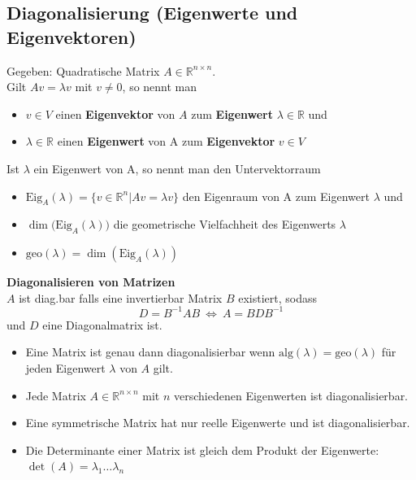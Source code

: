 \documentclass[6pt,a4paper]{scrartcl}
\begin{document}
\begin{multicols*}{4}
\subsection{Diagonalisierung (Eigenwerte und Eigenvektoren)}
Gegeben: Quadratische Matrix $A \in \mathbb{R}^{n\times n}$.\\
Gilt $Av = \lambda v$ mit $v\ne 0$, so nennt man
\begin{itemize}\itemsep0pt
\item $v\in V$ einen \textbf{Eigenvektor} von $A$ zum \textbf{Eigenwert} $\lambda \in \mathbb{R}$ und 
\item $\lambda \in \mathbb{R}$ einen \textbf{Eigenwert} von A zum \textbf{Eigenvektor} $v\in V$
\end{itemize}
Ist $\lambda$ ein Eigenwert von A, so nennt man den Untervektorraum
\begin{itemize}\itemsep0pt
\item $\text{Eig}_A(\lambda) = \{v \in \mathbb{R}^n | Av = \lambda v\}$ den Eigenraum von A zum Eigenwert $\lambda$ und
\item $\dim({\text{Eig}_A(\lambda))}$ die geometrische Vielfachheit des Eigenwerts $\lambda$
\item $\text{geo}(\lambda) = \dim(\text{Eig}_A(\lambda))$
\end{itemize}
\textbf{Diagonalisieren von Matrizen}\\
$A$ ist diag.bar falls eine invertierbar Matrix $B$ existiert, sodass
\begin{equation*}
D=B^{-1}AB \ \Leftrightarrow \ A=BDB^{-1}
\end{equation*}
und $D$ eine Diagonalmatrix ist.
\begin{itemize}\itemsep0pt
\item Eine Matrix ist genau dann diagonalisierbar wenn $\text{alg}(\lambda)=\text{geo}(\lambda)$ für jeden Eigenwert $\lambda$ von $A$ gilt.
\item Jede Matrix $A \in \mathbb{R}^{n\times n}$ mit $n$ verschiedenen Eigenwerten ist diagonalisierbar.
\item Eine symmetrische Matrix hat nur reelle Eigenwerte und ist diagonalisierbar.
\item Die Determinante einer Matrix ist gleich dem Produkt der Eigenwerte: $\det(A)=\lambda_1\dots\lambda_n$
\end{itemize}

\end{multicols*}
\end{document}
